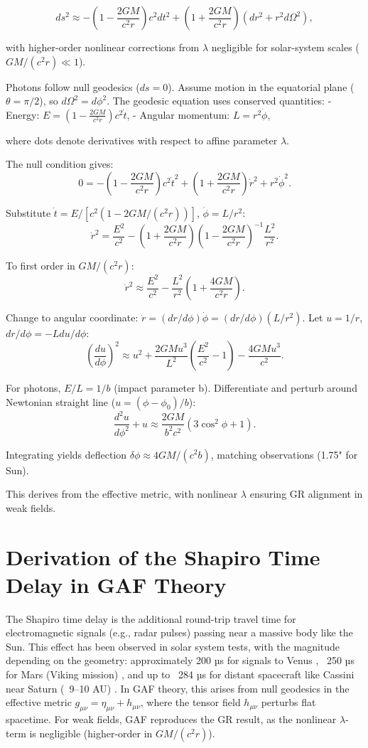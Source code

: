\documentclass{article}
\begin{document}
\[
ds^2 \approx -\left(1 - \frac{2GM}{c^2 r}\right) c^2 dt^2 + \left(1 + \frac{2GM}{c^2 r}\right) (dr^2 + r^2 d\Omega^2),
\]

with higher-order nonlinear corrections from \( \lambda \) negligible for solar-system scales (\( GM/(c^2 r) \ll 1 \)).

Photons follow null geodesics (\( ds = 0 \)). Assume motion in the equatorial plane (\( \theta = \pi/2 \)), so \( d\Omega^2 = d\phi^2 \). The geodesic equation uses conserved quantities:
- Energy: \( E = \left(1 - \frac{2GM}{c^2 r}\right) c^2 \dot{t} \),
- Angular momentum: \( L = r^2 \dot{\phi} \),

where dots denote derivatives with respect to affine parameter \( \lambda \).

The null condition gives:
\[
0 = -\left(1 - \frac{2GM}{c^2 r}\right) c^2 \dot{t}^2 + \left(1 + \frac{2GM}{c^2 r}\right) \dot{r}^2 + r^2 \dot{\phi}^2.
\]

Substitute \( \dot{t} = E / [c^2 (1 - 2GM/(c^2 r))] \), \( \dot{\phi} = L / r^2 \):
\[
\dot{r}^2 = \frac{E^2}{c^2} - \left(1 + \frac{2GM}{c^2 r}\right) \left(1 - \frac{2GM}{c^2 r}\right)^{-1} \frac{L^2}{r^2}.
\]

To first order in \( GM/(c^2 r) \):
\[
\dot{r}^2 \approx \frac{E^2}{c^2} - \frac{L^2}{r^2} \left(1 + \frac{4GM}{c^2 r}\right).
\]

Change to angular coordinate: \( \dot{r} = (dr/d\phi) \dot{\phi} = (dr/d\phi) (L / r^2) \). Let \( u = 1/r \), \( dr/d\phi = -L du/d\phi \):
\[
\left( \frac{du}{d\phi} \right)^2 \approx u^2 + \frac{2GM u^3}{L^2} \left( \frac{E^2}{c^2} - 1 \right) - \frac{4GM u^3}{c^2}.
\]

For photons, \( E/L = 1/b \) (impact parameter b). Differentiate and perturb around Newtonian straight line (\( u = (\phi - \phi_0)/b \)):
\[
\frac{d^2 u}{d\phi^2} + u \approx \frac{2GM}{b^2 c^2} (3 \cos^2 \phi + 1).
\]

Integrating yields deflection \( \delta \phi \approx 4GM/(c^2 b) \), matching observations (1.75" for Sun).

This derives from the effective metric, with nonlinear \( \lambda \) ensuring GR alignment in weak fields.

\section{Derivation of the Shapiro Time Delay in GAF Theory}

The Shapiro time delay is the additional round-trip travel time for electromagnetic signals (e.g., radar pulses) passing near a massive body like the Sun. This effect has been observed in solar system tests, with the magnitude depending on the geometry: approximately 200 µs for signals to Venus \cite{Shapiro1968}, ~250 µs for Mars (Viking mission) \cite{Reasenberg1979}, and up to ~284 µs for distant spacecraft like Cassini near Saturn (~9–10 AU) \cite{Bertotti2003}. In GAF theory, this arises from null geodesics in the effective metric \( g_{\mu\nu} = \eta_{\mu\nu} + h_{\mu\nu} \), where the tensor field \( h_{\mu\nu} \) perturbs flat spacetime. For weak fields, GAF reproduces the GR result, as the nonlinear \( \lambda \)-term is negligible (higher-order in \( GM/(c^2 r) \)).
\end{document}
